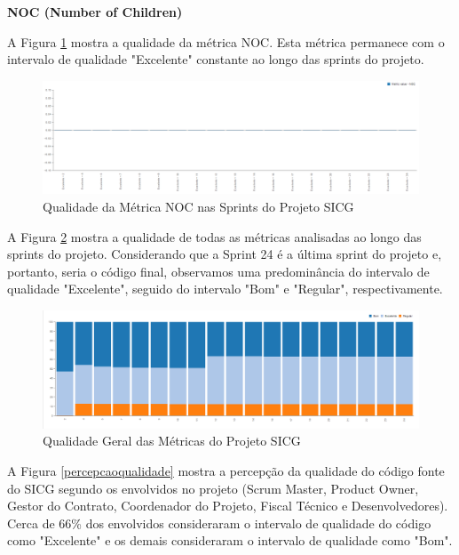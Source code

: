 \textbf{NOC (Number of Children)}

A Figura \ref{noc} mostra a qualidade da métrica NOC. Esta métrica permanece com o intervalo de qualidade "Excelente" constante ao longo das sprints do projeto.

\begin{figure}[H]
		\centering
			\includegraphics[scale=0.4]{figuras/noc.png}
		\caption{Qualidade da Métrica NOC nas Sprints do Projeto SICG}
		\label{noc}
\end{figure}

A Figura \ref{qualidadesprint} mostra a qualidade de todas as métricas analisadas ao longo das sprints do projeto. Considerando que a Sprint 24 é a última sprint do projeto e, portanto, seria o código final, observamos uma predominância do intervalo de qualidade "Excelente", seguido do intervalo "Bom" e "Regular", respectivamente. 

\begin{figure}[H]
		\centering
			\includegraphics[scale=0.4]{figuras/qualidadesprint.png}
		\caption{Qualidade Geral das Métricas do Projeto SICG}
		\label{qualidadesprint}
\end{figure}


A Figura \ref{percepcaoqualidade} mostra a percepção da qualidade do código fonte do SICG segundo os envolvidos no projeto (Scrum Master, Product Owner, Gestor do Contrato, Coordenador do Projeto, Fiscal Técnico e Desenvolvedores). Cerca de 66\% dos envolvidos consideraram  o intervalo de qualidade do código como "Excelente" e os demais consideraram
o intervalo de qualidade como "Bom".

